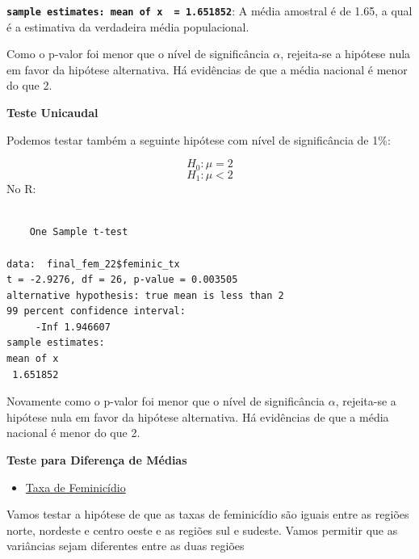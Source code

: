 \documentclass[
  letterpaper,
  DIV=11,
  numbers=noendperiod]{scrreprt}
\newenvironment{Shaded}{\begin{snugshade}}{\end{snugshade}}
\newcommand{\AttributeTok}[1]{\textcolor[rgb]{0.40,0.45,0.13}{#1}}
\newcommand{\ConstantTok}[1]{\textcolor[rgb]{0.56,0.35,0.01}{#1}}
\newcommand{\DecValTok}[1]{\textcolor[rgb]{0.68,0.00,0.00}{#1}}
\newcommand{\FloatTok}[1]{\textcolor[rgb]{0.68,0.00,0.00}{#1}}
\newcommand{\FunctionTok}[1]{\textcolor[rgb]{0.28,0.35,0.67}{#1}}
\newcommand{\NormalTok}[1]{\textcolor[rgb]{0.00,0.23,0.31}{#1}}
\newcommand{\SpecialCharTok}[1]{\textcolor[rgb]{0.37,0.37,0.37}{#1}}
\newcommand{\StringTok}[1]{\textcolor[rgb]{0.13,0.47,0.30}{#1}}
\providecommand{\tightlist}{%
  \setlength{\itemsep}{0pt}\setlength{\parskip}{0pt}}
\begin{document}
\textbf{\texttt{sample\ estimates:\ mean\ of\ x\ \ =\ 1.651852}}: A
média amostral é de 1.65, a qual é a estimativa da verdadeira média
populacional.

Como o p-valor foi menor que o nível de significância \(\alpha\),
rejeita-se a hipótese nula em favor da hipótese alternativa. Há
evidências de que a média nacional é menor do que 2.

\textbf{Teste Unicaudal}

Podemos testar também a seguinte hipótese com nível de significância de
1\%:

\[H_0: \mu = 2\] \[H_1:\mu < 2 \] No R:

\begin{Shaded}
\end{Shaded}

\begin{verbatim}

    One Sample t-test

data:  final_fem_22$feminic_tx
t = -2.9276, df = 26, p-value = 0.003505
alternative hypothesis: true mean is less than 2
99 percent confidence interval:
     -Inf 1.946607
sample estimates:
mean of x 
 1.651852 
\end{verbatim}

Novamente como o p-valor foi menor que o nível de significância
\(\alpha\), rejeita-se a hipótese nula em favor da hipótese alternativa.
Há evidências de que a média nacional é menor do que 2.

\textbf{Teste para Diferença de Médias}

\begin{itemize}
\tightlist
\item
  \ul{Taxa de Feminicídio}
\end{itemize}

Vamos testar a hipótese de que as taxas de feminicídio são iguais entre
as regiões norte, nordeste e centro oeste e as regiões sul e sudeste.
Vamos permitir que as variâncias sejam diferentes entre as duas regiões
\end{document}
